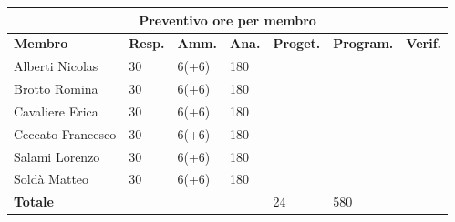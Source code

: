 \documentclass[a4paper, 12pt]{article}
\begin{document}
\begin{center}
	\begin{tabularx}{\textwidth}{|X|X|X|X|X|X|X|}
		\hline
		\multicolumn{7}{|c|}{\textbf{Preventivo ore per membro}}                                      \\
		\hline
		\hline
		\textbf{Membro}  & \textbf{Resp.} & \textbf{Amm.} & \textbf{Ana.} &
		\textbf{Proget.} & \textbf{Program.} & \textbf{Verif.} \\
		\hline
		Alberti Nicolas    	& 30 	& 6(+6)       & 180  & &  &                 \\
		\hline
		Brotto Romina    	& 30 	& 6(+6)       & 180  & &  &                 \\
		\hline
		Cavaliere Erica    	& 30 	& 6(+6)       & 180  & &  &                 \\
		\hline
		Ceccato Francesco    	& 30 	& 6(+6)       & 180  & &   &                \\
		\hline
		Salami Lorenzo    	& 30 	& 6(+6)       & 180  & &     &               \\
		\hline
		Soldà Matteo    	& 30 	& 6(+6)       & 180  & &   &                 \\
		\hline
		\hline
		\textbf{Totale} &    & & & 24           & 580      &               \\
		\hline
	\end{tabularx}\\[8pt]
	\mbox{}\\
\end{center}

\newpage
\end{document}
